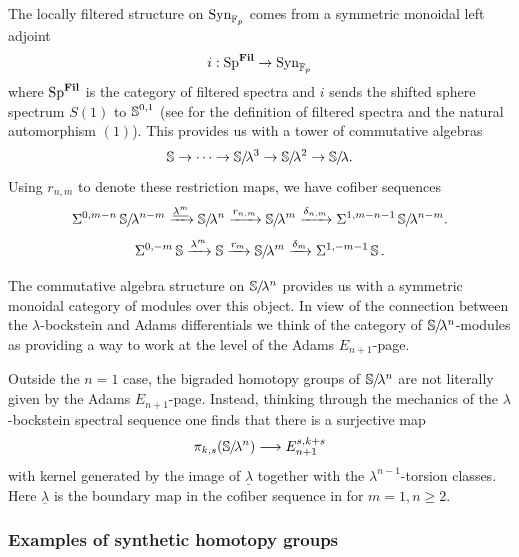 \begin{cnstr}\label{cnstr:bock-maps}
  The locally filtered structure on $\mathrm{Syn}_{\operatorname{\mathbb{F}}_p}$ comes from a symmetric monoidal left adjoint
  \[ i : \operatorname{\mathrm{Sp}}^{\operatorname{\mathbf{Fil}}} \to \mathrm{Syn}_{\operatorname{\mathbb{F}}_p} \]
where $\operatorname{\mathrm{Sp}}^{\operatorname{\mathbf{Fil}}}$ is the category of filtered spectra and $i$ sends the shifted sphere spectrum $S(1)$ to $\operatorname{\mathbb{S}}^{0,1}$ (see \cite[Definition B.3]{rmot} for the definition of filtered spectra and the natural automorphism $(1)$).
  This provides us with a tower of commutative algebras
  \[ \operatorname{\mathbb{S}} \to \cdots \to \operatorname{\mathbb{S}}\hspace{-2.2pt}/\!\lambda^3 \to \operatorname{\mathbb{S}}\hspace{-2.2pt}/\!\lambda^2 \to \operatorname{\mathbb{S}}\hspace{-2.2pt}/\!\lambda. \]
  Using $r_{n,m}$ to denote these restriction maps, we have cofiber sequences
  \[ \Sigma^{0,m-n}\operatorname{\mathbb{S}}\hspace{-2.2pt}/\!\lambda^{n-m} \xrightarrow{\underline{\lambda^{m}}}  \operatorname{\mathbb{S}}\hspace{-2.2pt}/\!\lambda^n \xrightarrow{r_{n,m}} \operatorname{\mathbb{S}}\hspace{-2.2pt}/\!\lambda^m \xrightarrow{\delta_{n,m}} \Sigma^{1, m-n-1}\operatorname{\mathbb{S}}\hspace{-2.2pt}/\!\lambda^{n-m}. \]
  \[ \Sigma^{0,-m}\operatorname{\mathbb{S}} \xrightarrow{{\lambda^{m}}}  \operatorname{\mathbb{S}} \xrightarrow{r_{m}} \operatorname{\mathbb{S}}\hspace{-2.2pt}/\!\lambda^m \xrightarrow{\delta_{m}} \Sigma^{1, -m-1} \operatorname{\mathbb{S}}. \]
\end{cnstr}

The commutative algebra structure on $\operatorname{\mathbb{S}}\hspace{-2.2pt}/\!\lambda^n$ provides us with a symmetric monoidal category of modules over this object. In view of the connection between the $\lambda$-bockstein and Adams differentials we think of the category of $\operatorname{\mathbb{S}}\hspace{-2.2pt}/\!\lambda^n$-modules as providing a way to work at the level of the Adams $E_{n+1}$-page.

\begin{wrn}
  Outside the $n=1$ case, 
  the bigraded homotopy groups of $\operatorname{\mathbb{S}}\hspace{-2.2pt}/\!\lambda^n$ are not literally given by the Adams $E_{n+1}$-page.
  Instead, thinking through the mechanics of the $\lambda$-bockstein spectral sequence one finds that there is a surjective map
  \[ \pi_{k,s}(\operatorname{\mathbb{S}}\hspace{-2.2pt}/\!\lambda^n) \longrightarrow E_{n+1}^{s, k+s} \]
  with kernel generated by the image of $\underline{\lambda}$ together with the $\lambda^{n-1}$-torsion classes. Here $\underline{\lambda}$ is the boundary map in the cofiber sequence in  for $m=1, n \geq 2$.
\end{wrn}

\subsubsection{Examples of synthetic homotopy groups}\hfill

